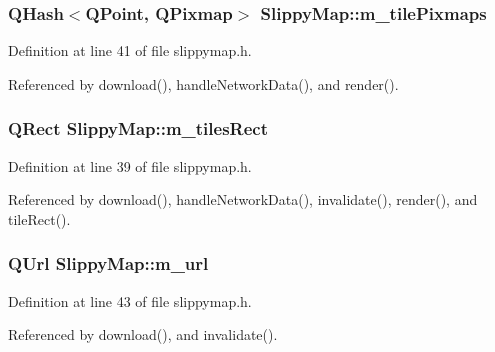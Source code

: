 \hypertarget{classSlippyMap_a2c88805d8030caedb95af10ce5d95aae}{
\subsubsection[{m\-\_\-tile\-Pixmaps}]{\setlength{\rightskip}{0pt plus 5cm}Q\-Hash$<$Q\-Point, Q\-Pixmap$>$ Slippy\-Map\-::m\-\_\-tile\-Pixmaps\hspace{0.3cm}{\ttfamily [private]}}}\label{classSlippyMap_a2c88805d8030caedb95af10ce5d95aae}


Definition at line 41 of file slippymap.\-h.



Referenced by download(), handle\-Network\-Data(), and render().

\hypertarget{classSlippyMap_aa8154d798c574c1d6ed89f3347835a76}{
\subsubsection[{m\-\_\-tiles\-Rect}]{\setlength{\rightskip}{0pt plus 5cm}Q\-Rect Slippy\-Map\-::m\-\_\-tiles\-Rect\hspace{0.3cm}{\ttfamily [private]}}}\label{classSlippyMap_aa8154d798c574c1d6ed89f3347835a76}


Definition at line 39 of file slippymap.\-h.



Referenced by download(), handle\-Network\-Data(), invalidate(), render(), and tile\-Rect().

\hypertarget{classSlippyMap_a3b265edb8c33bc1ff185cf081ea0fdaa}{
\subsubsection[{m\-\_\-url}]{\setlength{\rightskip}{0pt plus 5cm}Q\-Url Slippy\-Map\-::m\-\_\-url\hspace{0.3cm}{\ttfamily [private]}}}\label{classSlippyMap_a3b265edb8c33bc1ff185cf081ea0fdaa}


Definition at line 43 of file slippymap.\-h.



Referenced by download(), and invalidate().

